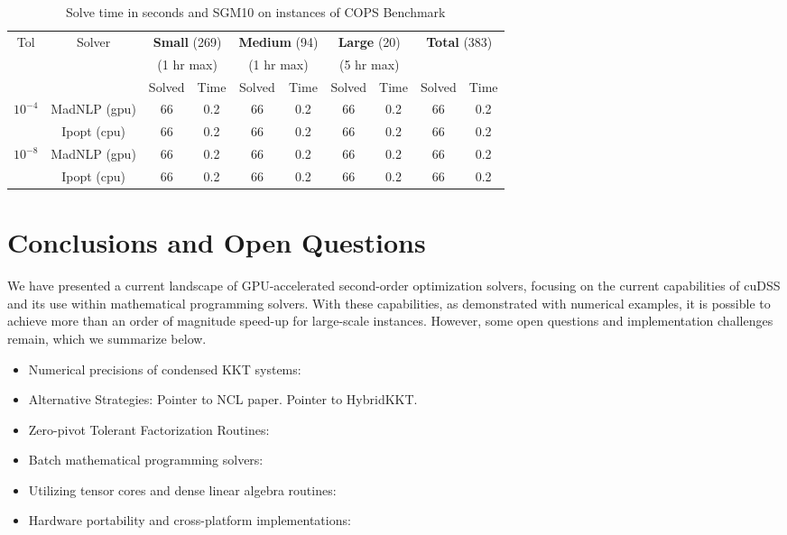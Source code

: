 \documentclass{article}
\begin{document}
\begin{table}[t]
  \centering\small
  \caption{Solve time in seconds and SGM10 on instances of COPS Benchmark}\label{tab:cops}
  \begin{tabular}{|c|c|cc|cc|cc|cc|}
    \hline
    \multirow{ 3}{*}{Tol} & \multirow{ 3}{*}{Solver} & \multicolumn{2}{c|}{\textbf{Small} (269)}& \multicolumn{2}{c|}{\textbf{Medium} (94)}& \multicolumn{2}{c|}{\textbf{Large} (20)}& \multicolumn{2}{c|}{\multirow{2}{*}{\textbf{Total} (383)}}\\
                          && \multicolumn{2}{c|}{(1 hr max)}& \multicolumn{2}{c|}{(1 hr max)}& \multicolumn{2}{c|}{(5 hr max)}&&\\
                          &&  Solved & Time &  Solved & Time &  Solved & Time &  Solved & Time \\
    \hline
    \multirow{2}{*}{$10^{-4}$} & MadNLP (gpu) & 66 & 0.2 & 66 & 0.2 & 66 & 0.2 & 66 & 0.2  \\
                          & Ipopt (cpu) & 66 & 0.2 & 66 & 0.2 & 66 & 0.2 & 66 & 0.2 \\
    \hline
    \multirow{2}{*}{$10^{-8}$} & MadNLP (gpu) & 66 & 0.2 & 66 & 0.2 & 66 & 0.2& 66 & 0.2 \\
                          & Ipopt (cpu) & 66 & 0.2 & 66 & 0.2 & 66 & 0.2& 66 & 0.2 \\
    \hline
  \end{tabular}
\end{table}


\section{Conclusions and Open Questions}
We have presented a current landscape of GPU-accelerated second-order optimization solvers, focusing on the current capabilities of cuDSS and its use within mathematical programming solvers. With these capabilities, as demonstrated with numerical examples, it is possible to achieve more than an order of magnitude speed-up for large-scale instances. However, some open questions and implementation challenges remain, which we summarize below.
\begin{itemize}[leftmargin=*,itemsep=0pt,parsep=0pt,partopsep=0pt]
\item {Numerical precisions of condensed KKT systems}:
\item {Alternative Strategies}:
Pointer to NCL paper.
Pointer to HybridKKT.
\item {Zero-pivot Tolerant Factorization Routines}:
\item {Batch mathematical programming solvers}:
\item {Utilizing tensor cores and dense linear algebra routines}:
\item {Hardware portability and cross-platform implementations}:
\end{itemize}
\end{document}

